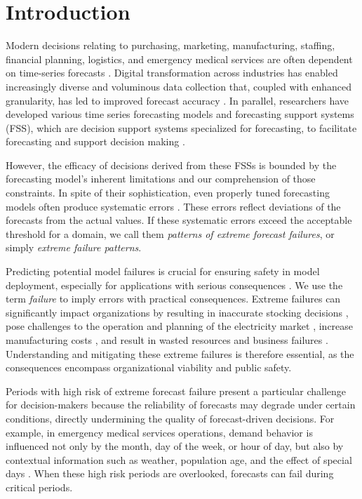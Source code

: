\documentclass[ijds,sglanonrev]{informs4}
\begin{document}

\section{Introduction}\label{sec:Intro}
Modern decisions relating to purchasing, marketing, manufacturing, staffing, financial planning, logistics, and emergency medical services are often dependent on time-series forecasts \citep{abreu2023, fildes2006}. Digital transformation across industries has enabled increasingly diverse and voluminous data collection that, coupled with enhanced granularity, has led to improved forecast accuracy \citep{chae2024}. In parallel, researchers have developed various time series forecasting models and forecasting support systems (FSS), which are decision support systems specialized for forecasting, to facilitate forecasting and support decision making \citep{asimakopoulos2013, fildes2006, petropoulos2022}. 

However, the efficacy of decisions derived from these FSSs is bounded by the forecasting model’s inherent limitations and our comprehension of those constraints. In spite of their sophistication, even properly tuned forecasting models often produce systematic errors \citep{eyuboglu2022}. These errors reflect deviations of the forecasts from the actual values. If these systematic errors exceed the acceptable threshold for a domain, we call them \emph{patterns of extreme forecast failures}, or simply %
\emph{extreme failure patterns}.

Predicting potential model failures is crucial for ensuring safety in model deployment, especially for applications with serious consequences \citep{tsiligkaridis2021}. We use the term \emph{failure} to imply errors with practical consequences. Extreme failures can significantly impact organizations by resulting in inaccurate stocking decisions \citep{boylan2021}, pose challenges to the operation and planning of the electricity market \citep{zhu2025}, increase manufacturing costs \citep{sanders2009}, and result in wasted resources and business failures \citep{chae2024}. Understanding and mitigating these extreme failures is therefore essential, as the consequences encompass organizational viability and public safety.

Periods with high risk of extreme forecast failure present a particular challenge for decision-makers because the reliability of forecasts may degrade under certain conditions, directly undermining the quality of forecast-driven decisions. For example, in emergency medical services operations, demand behavior is influenced not only by the month, day of the week, or hour of  day, but also by contextual information such as weather, population age, and the effect of special days \citep{abreu2023}. When these high risk periods are overlooked, forecasts can fail during critical periods.
\end{document}
